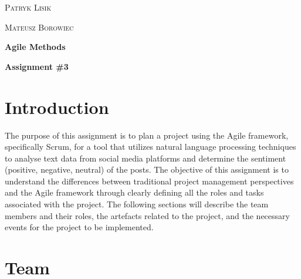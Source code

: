 \documentclass[a4paper,12pt]{article}
\begin{document}
\begin{titlepage}
\vspace{3cm}

\begin{minipage}{0.33 \textwidth}
\begin{flushleft}
\large
\textsc{Patryk Lisik}
\end{flushleft}
\end{minipage}
\hspace{0.2\textwidth}
\begin{minipage}{0.33 \textwidth}
\begin{flushleft}
\large
\textsc{Mateusz Borowiec}
\end{flushleft}
\end{minipage}

\vspace{2cm}

{\center\huge\bfseries Agile Methods \par}

\vspace{1.5cm}
{\center\huge\bfseries Assignment \#3\par}

\end{titlepage}




\section{Introduction}
The purpose of this assignment is to plan a project using the Agile framework, specifically Scrum, for a tool that utilizes natural language processing techniques to analyse text data from social media platforms and determine the sentiment (positive, negative, neutral) of the posts. The objective of this assignment is to understand the differences between traditional project management perspectives and the Agile framework through clearly defining all the roles and tasks associated with the project. The following sections will describe the team members and their roles, the artefacts related to the project, and the necessary events for the project to be implemented.
\tableofcontents

\newpage
\section{Team}
\end{document}
